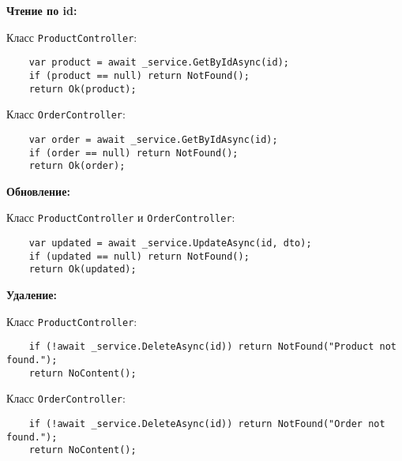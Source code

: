 \documentclass[a4paper,12pt]{report}
\begin{document}
\textbf{Чтение по id:}

Класс \texttt{ProductController}:
\begin{verbatim}
    var product = await _service.GetByIdAsync(id);
    if (product == null) return NotFound();
    return Ok(product);
\end{verbatim}

Класс \texttt{OrderController}:
\begin{verbatim}
    var order = await _service.GetByIdAsync(id);
    if (order == null) return NotFound();
    return Ok(order);
\end{verbatim}

\textbf{Обновление:}

Класс \texttt{ProductController} и \texttt{OrderController}:
\begin{verbatim}
    var updated = await _service.UpdateAsync(id, dto);
    if (updated == null) return NotFound();
    return Ok(updated);
\end{verbatim}

\textbf{Удаление:}

Класс \texttt{ProductController}:
\begin{verbatim}
    if (!await _service.DeleteAsync(id)) return NotFound("Product not found.");
    return NoContent();
\end{verbatim}

Класс \texttt{OrderController}:
\begin{verbatim}
    if (!await _service.DeleteAsync(id)) return NotFound("Order not found.");
    return NoContent();
\end{verbatim}







\end{document}
